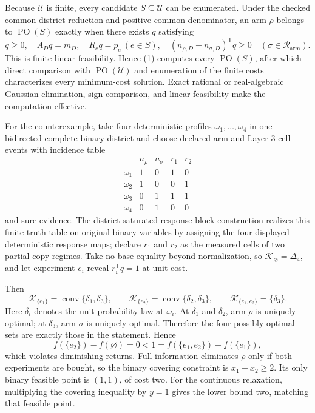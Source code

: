 Because \(\mathcal U\) is finite, every candidate \(S\subseteq\mathcal U\) can be enumerated.  Under the checked common-district reduction and positive common denominator, an arm \(\rho\) belongs to \(\operatorname{PO}(S)\) exactly when there exists \(q\) satisfying
\[
q\ge0,\quad A_Dq=m_D,\quad R_eq=p_e\ (e\in S),
\quad (n_{\rho,D}-n_{\sigma,D})^{\mathsf T}q\ge0
\quad(\sigma\in\mathcal R_{\mathrm{arm}}).
\tag{1}
\]
This is finite linear feasibility.  Hence (1) computes every \(\operatorname{PO}(S)\), after which direct comparison with \(\operatorname{PO}(\mathcal U)\) and enumeration of the finite costs characterizes every minimum-cost solution.  Exact rational or real-algebraic Gaussian elimination, sign comparison, and linear feasibility make the computation effective.

For the counterexample, take four deterministic profiles \(\omega_1,\ldots,\omega_4\) in one bidirected-complete binary district and choose declared arm and Layer-3 cell events with incidence table
\[
\begin{array}{c|rrrr}
&n_\rho&n_\sigma&r_1&r_2\\\hline
\omega_1&1&0&1&0\\
\omega_2&1&0&0&1\\
\omega_3&0&1&1&1\\
\omega_4&0&1&0&0
\end{array}
\]
and sure evidence.  The district-saturated response-block construction realizes this finite truth table on original binary variables by assigning the four displayed deterministic response maps; declare \(r_1\) and \(r_2\) as the measured cells of two partial-copy regimes.  Take no base equality beyond normalization, so \(\mathcal K_\varnothing=\Delta_4\), and let experiment \(e_i\) reveal \(r_i^{\mathsf T}q=1\) at unit cost.

Then
\[
\mathcal K_{\{e_1\}}=\operatorname{conv}\{\delta_1,\delta_3\},
\qquad
\mathcal K_{\{e_2\}}=\operatorname{conv}\{\delta_2,\delta_3\},
\qquad
\mathcal K_{\{e_1,e_2\}}=\{\delta_3\}.
\]
Here \(\delta_i\) denotes the unit probability law at \(\omega_i\).  At \(\delta_1\) and \(\delta_2\), arm \(\rho\) is uniquely optimal; at \(\delta_3\), arm \(\sigma\) is uniquely optimal.  Therefore the four possibly-optimal sets are exactly those in the statement.  Hence
\[
f(\{e_2\})-f(\varnothing)=0
<1=f(\{e_1,e_2\})-f(\{e_1\}),
\]
which violates diminishing returns.  Full information eliminates \(\rho\) only if both experiments are bought, so the binary covering constraint is \(x_1+x_2\ge2\).  Its only binary feasible point is \((1,1)\), of cost two.  For the continuous relaxation, multiplying the covering inequality by \(y=1\) gives the lower bound two, matching that feasible point.